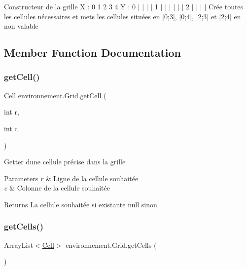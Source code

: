 Constructeur de la grille X \+: 0 1 2 3 4 Y \+: 0 $\vert$ $\vert$ $\vert$ $\vert$ 1 $\vert$ $\vert$ $\vert$ $\vert$ $\vert$ $\vert$ 2 $\vert$ $\vert$ $\vert$ $\vert$ Crée toutes les cellules nécessaires et mets les cellules situées en \mbox{[}0;3\mbox{]}, \mbox{[}0;4\mbox{]}, \mbox{[}2;3\mbox{]} et \mbox{[}2;4\mbox{]} en non valable 

\subsection{Member Function Documentation}
\hypertarget{classenvironnement_1_1_grid_a81df13c46a58ff1f2accb6debafcced7}{}\label{classenvironnement_1_1_grid_a81df13c46a58ff1f2accb6debafcced7} 
\subsubsection{\texorpdfstring{get\+Cell()}{getCell()}}
{\footnotesize\ttfamily \hyperlink{classenvironnement_1_1_cell}{Cell} environnement.\+Grid.\+get\+Cell (\begin{DoxyParamCaption}\item[{int}]{r,  }\item[{int}]{c }\end{DoxyParamCaption})}

Getter d\textquotesingle{}une cellule précise dans la grille 
\begin{DoxyParams}{Parameters}
{\em r} & Ligne de la cellule souhaitée \\
\hline
{\em c} & Colonne de la cellule souhaitée \\
\hline
\end{DoxyParams}
\begin{DoxyReturn}{Returns}
La cellule souhaitée si existante null sinon 
\end{DoxyReturn}
\hypertarget{classenvironnement_1_1_grid_abaf214d02e4a27765bb266d5e46741de}{}\label{classenvironnement_1_1_grid_abaf214d02e4a27765bb266d5e46741de} 
\subsubsection{\texorpdfstring{get\+Cells()}{getCells()}}
{\footnotesize\ttfamily Array\+List$<$\hyperlink{classenvironnement_1_1_cell}{Cell}$>$ environnement.\+Grid.\+get\+Cells (\begin{DoxyParamCaption}{ }\end{DoxyParamCaption})}

